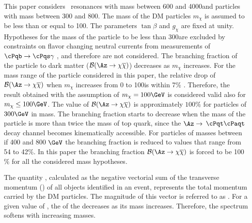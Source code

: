 This paper considers \cPZpr\ resonances with mass between 600 and 4000\GeV and 
\Az particles with mass between 300 and 800\GeV. The mass of the DM particles $m_{\chi}$
is assumed to be less than or equal to 100\GeV. The parameters $\tan \beta$ and $g_{\chi}$ are fixed at unity.
Hypotheses for the mass of the \Az particle to be less than 300\GeV are excluded by constraints on flavor changing
neutral currents from measurements of $\cPqb\rightarrow \cPqs\gamma$ \cite{Branco:2011iw},
and therefore are not considered. The branching fraction of the \Az particle to dark matter (${\cal B}(\Az\rightarrow\chi\overline{\chi})$) decreases as $m_{\chi}$ increases.
For the mass range of the \Az particle considered in this paper, the relative drop of
${\cal B}(\Az\rightarrow\chi\overline{\chi})$ when $m_{\chi}$
increases from 0 to 100\GeV is within 7\% . Therefore, the result obtained with the assumption of $m_{\chi}= 100\GeV$ is considered valid also for $m_{\chi}\leq 100\GeV$.
The value of ${\cal B}(\Az\rightarrow\chi\overline{\chi})$ is approximately $100\%$ for \Az particles of $300\GeV$ in mass.
The branching fraction starts to decrease when the mass of the \Az particle is more than twice the mass
of top quark, since the $\Az\rightarrow$ $\cPqt\cPaqt$ decay channel becomes kinematically
accessible. For \Az particles of masses between if 400 and 800 $\GeV$ the branching fraction is reduced to values that range from 54 to 42$\%$. In this paper the branching fraction ${\cal B}(\Az\rightarrow\chi\overline{\chi})$ is forced to be 100 $\%$ for all the considered mass hypotheses.

The quantity \ptvecmiss, calculated as the negative vectorial sum of the transverse momentum (\pt) of all objects identified in an event, 
represents the total
momentum carried by the DM particles.
The magnitude of this vector is referred to as \MET.
For a given value of \mzp, the \pt of the \Az decreases as its mass increases.
Therefore, the \MET spectrum softens with increasing \Az masses.


